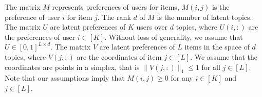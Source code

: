 The matrix $M$ represents preferences of users for items, $M(i, j)$ is the preference of user $i$ for item $j$. The rank $d$ of $M$ is the number of latent topics. The matrix $U$ are latent preferences of $K$ users over $d$ topics, where $U(i, :)$ are the preferences of user $i \in [K]$. Without loss of generality, we assume that $U \in [0, 1]^{L \times d}$. The matrix $V$ are latent preferences of $L$ items in the space of $d$ topics, where $V(j, :)$ are the coordinates of item $j \in [L]$. We assume that the coordinates are points in a simplex, that is $\|V(j, :)\|_1 \leq 1$ for all $j \in [L]$. Note that our assumptions imply that $M(i, j) \geq 0$ for any $i \in [K]$ and $j \in [L]$.
